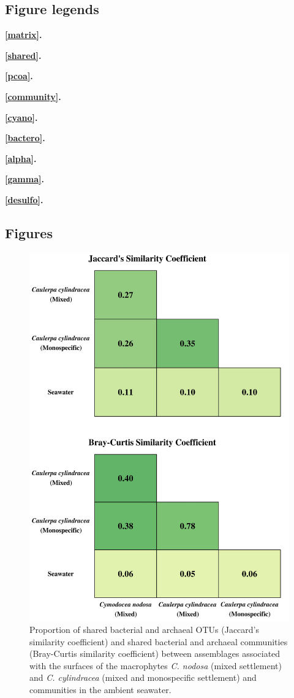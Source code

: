 \documentclass[12pt,]{article}
\begin{document}
\newpage 
\setlength\parindent{0pt}

\hypertarget{figure-legends}{%
\subsection{Figure legends}\label{figure-legends}}

\textbf{\autoref{matrix}.} 

\textbf{\autoref{shared}.} 

\textbf{\autoref{pcoa}.} 

\textbf{\autoref{community}.} 

\textbf{\autoref{cyano}.} 

\textbf{\autoref{bactero}.} 

\textbf{\autoref{alpha}.} 

\textbf{\autoref{gamma}.} 

\textbf{\autoref{desulfo}.} 

\hypertarget{figures}{%
\subsection{Figures}\label{figures}}

\begin{figure}[H]

{\centering \includegraphics[width=0.7\linewidth]{../results/figures/matrix} 

}

\caption{Proportion of shared bacterial and archaeal OTUs (Jaccard's similarity coefficient) and shared bacterial and archaeal communities (Bray-Curtis similarity coefficient) between assemblages associated with the surfaces of the macrophytes \textit{C. nodosa} (mixed settlement) and \textit{C. cylindracea} (mixed and monospecific settlement) and communities in the ambient seawater.\label{matrix}}\label{fig:unnamed-chunk-1}
\end{figure}
\end{document}
